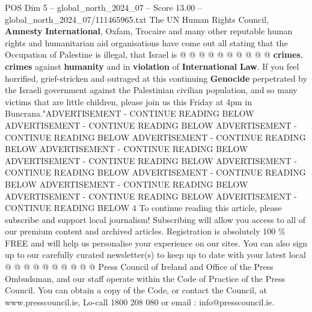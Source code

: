 \begin{textsample}{POS Dim 5 – global\_north\_2024\_07 – Score 13.00 – global\_north\_2024\_07/111465965.txt}
The UN Human Rights Council, \textbf{Amnesty} \textbf{International}, Oxfam, Trocaire and many other reputable human rights and humanitarian aid organisations have come out all stating that the Occupation of Palestine is illegal, that Israel is @ @ @ @ @ @ @ @ @ @ \textbf{crimes}, \textbf{crimes} against \textbf{humanity} and in \textbf{violation} of \textbf{International} \textbf{Law}.
If you feel horrified, grief-stricken and outraged at this continuing \textbf{Genocide} perpetrated by the Israeli government against the Palestinian civilian population, and so many victims that are little children, please join us this Friday at 4pm in Buncrana."ADVERTISEMENT - CONTINUE READING BELOW ADVERTISEMENT - CONTINUE READING BELOW ADVERTISEMENT - CONTINUE READING BELOW ADVERTISEMENT - CONTINUE READING BELOW ADVERTISEMENT - CONTINUE READING BELOW ADVERTISEMENT - CONTINUE READING BELOW ADVERTISEMENT - CONTINUE READING BELOW ADVERTISEMENT - CONTINUE READING BELOW ADVERTISEMENT - CONTINUE READING BELOW ADVERTISEMENT - CONTINUE READING BELOW ADVERTISEMENT - CONTINUE READING BELOW 4 To continue reading this article, please subscribe and support local journalism!
Subscribing will allow you access to all of our premium content and archived articles.
Registration is absolutely 100 \% FREE and will help us personalise your experience on our sites.
You can also sign up to our carefully curated newsletter(s) to keep up to date with your latest local @ @ @ @ @ @ @ @ @ @ Press Council of Ireland and Office of the Press Ombudsman, and our staff operate within the Code of Practice of the Press Council.
You can obtain a copy of the Code, or contact the Council, at www.presscouncil.ie, Lo-call 1800 208 080 or email : info@presscouncil.ie.

\end{textsample}
